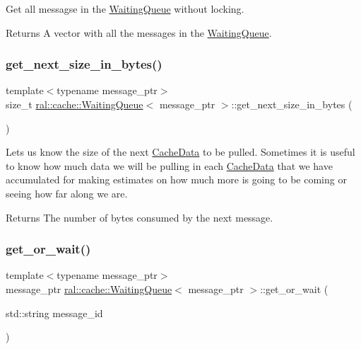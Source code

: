 Get all messagse in the \hyperlink{classral_1_1cache_1_1WaitingQueue}{Waiting\+Queue} without locking. \begin{DoxyReturn}{Returns}
A vector with all the messages in the \hyperlink{classral_1_1cache_1_1WaitingQueue}{Waiting\+Queue}. 
\end{DoxyReturn}
\mbox{\label{classral_1_1cache_1_1WaitingQueue_acbb3be52777e0a087a969b220377177a}} 
\subsubsection{\texorpdfstring{get\+\_\+next\+\_\+size\+\_\+in\+\_\+bytes()}{get\_next\_size\_in\_bytes()}}
{\footnotesize\ttfamily template$<$typename message\+\_\+ptr$>$ \\
size\+\_\+t \hyperlink{classral_1_1cache_1_1WaitingQueue}{ral\+::cache\+::\+Waiting\+Queue}$<$ message\+\_\+ptr $>$\+::get\+\_\+next\+\_\+size\+\_\+in\+\_\+bytes (\begin{DoxyParamCaption}{ }\end{DoxyParamCaption})\hspace{0.3cm}{\ttfamily [inline]}}

Let\textquotesingle{}s us know the size of the next \hyperlink{classral_1_1cache_1_1CacheData}{Cache\+Data} to be pulled. Sometimes it is useful to know how much data we will be pulling in each \hyperlink{classral_1_1cache_1_1CacheData}{Cache\+Data} that we have accumulated for making estimates on how much more is going to be coming or seeing how far along we are. \begin{DoxyReturn}{Returns}
The number of bytes consumed by the next message. 
\end{DoxyReturn}
\mbox{\label{classral_1_1cache_1_1WaitingQueue_a8225fd0f55e72bf630f261def644d527}} 
\subsubsection{\texorpdfstring{get\+\_\+or\+\_\+wait()}{get\_or\_wait()}}
{\footnotesize\ttfamily template$<$typename message\+\_\+ptr$>$ \\
message\+\_\+ptr \hyperlink{classral_1_1cache_1_1WaitingQueue}{ral\+::cache\+::\+Waiting\+Queue}$<$ message\+\_\+ptr $>$\+::get\+\_\+or\+\_\+wait (\begin{DoxyParamCaption}\item[{std\+::string}]{message\+\_\+id }\end{DoxyParamCaption})\hspace{0.3cm}{\ttfamily [inline]}}

